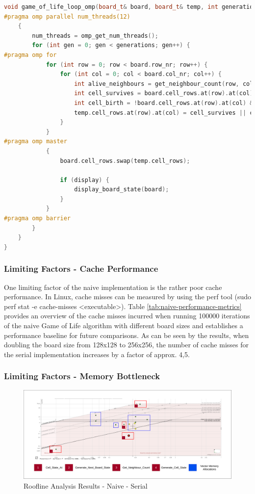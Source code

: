 \documentclass[a4paper,english,12pt,twoside=false]{scrartcl} %
\begin{document}
\begin{lstlisting}[caption={Parallel Naive State Generation Algorithm},label={lst:gol-parallel-naive-generation-algorithm},language=C++]
void game_of_life_loop_omp(board_t& board, board_t& temp, int generations, int display) {
#pragma omp parallel num_threads(12)
    {
        num_threads = omp_get_num_threads();
        for (int gen = 0; gen < generations; gen++) {
#pragma omp for
            for (int row = 0; row < board.row_nr; row++) {
                for (int col = 0; col < board.col_nr; col++) {
                    int alive_neighbours = get_neighbour_count(row, col, board);
                    int cell_survives = board.cell_rows.at(row).at(col) && (alive_neighbours == 2 || alive_neighbours == 3);
                    int cell_birth = !board.cell_rows.at(row).at(col) && (alive_neighbours == 3);
                    temp.cell_rows.at(row).at(col) = cell_survives || cell_birth;
                }
            }
#pragma omp master
            {
                board.cell_rows.swap(temp.cell_rows);

                if (display) {
                    display_board_state(board);
                }
            }
#pragma omp barrier
        }
    }
}
\end{lstlisting}

\subsubsection{Limiting Factors - Cache Performance}

One limiting factor of the naive implementation is the rather poor cache performance. In Linux, cache misses can be measured by using the perf tool (sudo perf stat -e cache-misses <executable>). Table \ref{tab:naive-performance-metrics} provides an overview of the cache misses incurred when running 100000 iterations of the naive Game of Life algorithm with different board sizes and establishes a performance baseline for future comparisons. As can be seen by the results, when doubling the board size from 128x128 to 256x256, the number of cache misses for the serial implementation increases by a factor of approx. 4,5. 

\subsubsection{Limiting Factors - Memory Bottleneck}

\begin{figure}[tbh!]
	\centering
	\includegraphics[width=16cm]{imgs/roofline-naive-32-100k.png}
	\caption{Roofline Analysis Results - Naive - Serial}
	\label{fig:roofline-naive-32-100k}
\end{figure}
\end{document}
